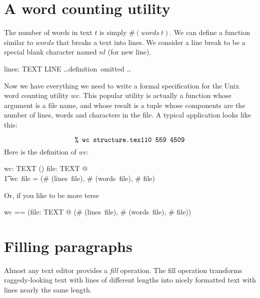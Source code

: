 \documentclass{article}
\begin{document}
\section{A word counting utility}

The number of words in text $t$ is simply $\# (words~t)$.  We can define a
function similar to $words$ that breaks a text into lines.  We consider a 
line break to be a special blank character named $nl$ (for new line).

\begin{axdef}
        lines: TEXT \fun \seq LINE
\where 
	\dots \mbox{definition omitted} \dots
\end{axdef} 
Now we have everything we need to write a formal specification for the Unix
word counting utility $wc$.  This popular utility is actually a function
whose argument is a file name, and whose result is a tuple whose components
are the number of lines, words and characters in the file.  A typical
application looks like this:

\[
\mbox{{\tt \% wc structure.tex}}\\
\mbox{{\tt 110 559 4509}}
\]
Here is the definition of $wc$:

\begin{axdef}
	wc: TEXT \fun (\nat \cross \nat \cross \nat)
\where
	\forall file: TEXT @ \\
\t1		wc~file = (\# (lines~file), \# (words~file), \# file)
\end{axdef}
Or, if you like to be more terse

\begin{zed}
   wc == (\lambda file: TEXT @ (\# (lines~file), \# (words~file), \# file))
\end{zed}

\section{Filling paragraphs}

Almost any text editor provides a {\em fill} operation.  The fill operation
transforms raggedy-looking text with lines of different lengths into
nicely formatted text with lines nearly the same length.
\end{document}
